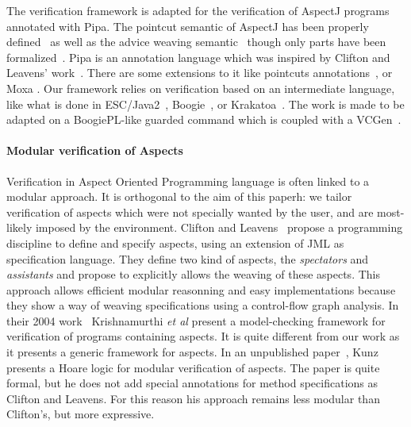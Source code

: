 The verification framework is adapted for the
verification of AspectJ programs annotated with Pipa.  The pointcut
semantic of AspectJ has been properly
defined~\cite{DBLP:conf/popl/AvgustinovHOMSTV07} as well as the advice
weaving semantic~\cite{weaving04} though only parts have been
formalized~\cite{weaving06}.  Pipa is an annotation language which was
inspired by Clifton and Leavens' work~\cite{clifton02observers}. There
are some extensions to it like pointcuts
annotations~\cite{pointcuts07}, or Moxa \cite{moxa05}.  Our framework
relies on verification based on an intermediate language, like what is
done in ESC/Java2~\cite{FlanaganLLNSS02}, Boogie~\cite{BarnettCDJL05},
or Krakatoa~\cite{MarcheP-MU04}. The work is made to be adapted on a
BoogiePL-like guarded command which is coupled with a
VCGen~\cite{BarnettL05,FlanaganS01}.

\paragraph{Modular verification of Aspects}
Verification in Aspect Oriented Programming language is often linked
to a modular approach.  It is orthogonal to the aim of this paperh: we
tailor verification of aspects which were not specially wanted by the
user, and are most-likely imposed by the environment.  Clifton and
Leavens~\cite{clifton02observers,clifton02spectators,cliftonPhd}
propose a programming discipline to define and specify aspects, using
an extension of JML as specification language.  They define two kind
of aspects, the \emph{spectators} and \emph{assistants} and propose to
explicitly allows the weaving of these aspects. This approach allows
efficient modular reasonning and easy implementations because they
show a way of weaving specifications using a control-flow graph
analysis. In their 2004 work~\cite{shriram04} Krishnamurthi {\it et
al} present a model-checking framework for verification of programs
containing aspects. It is quite different from our work as it presents
a generic framework for aspects. In an unpublished paper~\cite{cesar},
Kunz presents a Hoare logic for modular verification of aspects. The
paper is quite formal, but he does not add special annotations for method
specifications as Clifton and Leavens. For this reason his approach remains 
less modular than Clifton's, but more expressive.











